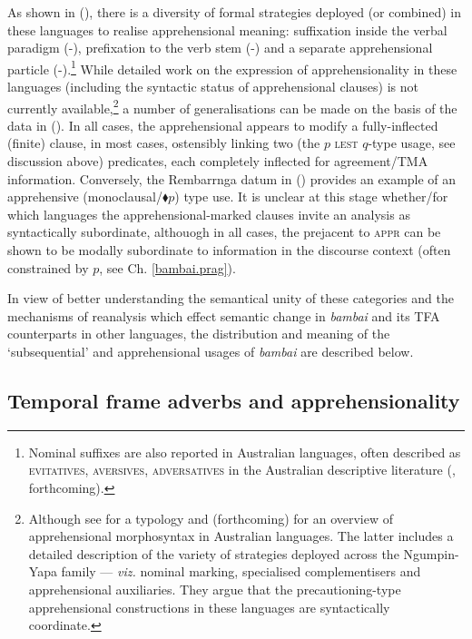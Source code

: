 As shown in (\lastx), there is a diversity of formal strategies deployed (or combined) in these languages to realise apprehensional meaning: suffixation inside the verbal paradigm (-), prefixation to the verb stem (-) and a separate apprehensional particle (-).\footnote{Nominal suffixes are also reported in Australian languages, often described as \textsc{evitatives}, \textsc{aversives, adversatives} in the Australian descriptive literature (\citealp[9]{Zester2010}, \citealp[][]{Browne} forthcoming).} While detailed work on the expression of apprehensionality in these languages (including the syntactic status of apprehensional clauses) is not currently available,\footnote{Although see \citet{Zester2010} for a typology and \citet{Browne} (forthcoming) for an overview of apprehensional morphosyntax in Australian languages. The latter includes a detailed description of the variety of strategies deployed across the Ngumpin-Yapa family --- \textit{viz.} nominal marking, specialised complementisers and apprehensional auxiliaries. They argue that the precautioning-type apprehensional constructions in these languages are syntactically coordinate.} a number of generalisations can be made on the basis of the data in (\lastx). In all cases, the apprehensional appears to modify a fully-inflected (finite) clause, in most cases, ostensibly linking two (the $ p $ \textsc{lest} $ q $-type usage, see discussion above) predicates, each completely inflected for agreement/TMA information. Conversely, the Rembarrnga datum in () provides an example of an apprehensive (monoclausal/$ \blacklozenge p $) type use. It is unclear at this stage whether/for which languages the apprehensional-marked clauses invite an analysis as syntactically subordinate, althouogh in all cases, the prejacent to \textsc{appr} can be shown to be modally subordinate to information in the discourse context (often constrained by $ p $, see Ch. \ref{bambai.prag}). 

 In view of better understanding the semantical unity of these categories and the mechanisms of reanalysis which effect semantic change in \textit{bambai} and its TFA counterparts in other languages, the distribution and meaning of the `subsequential' and apprehensional usages of \textit{bambai} are described below.
 
\subsection{Temporal frame adverbs and apprehensionality}\label{dataS}

